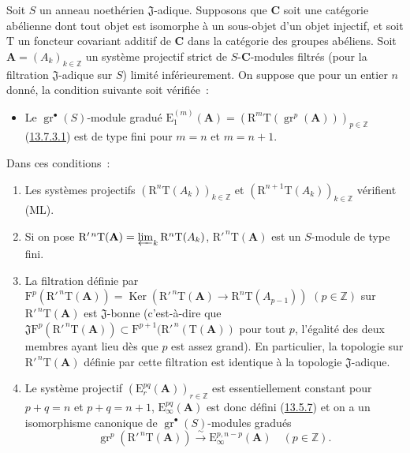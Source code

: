 \begin{proposition}[13.7.7]
\label{0.13.7.7-fr}
Soit $S$ un anneau noethérien $\mathfrak J$-adique. Supposons que $\boldsymbol{C}$ soit
une catégorie abélienne dont tout objet est isomorphe à un sous-objet d'un
objet injectif, et soit $\mathrm T$ un foncteur covariant additif de $\boldsymbol{C}$ dans
la catégorie des groupes abéliens. Soit
$\mathbf A=(A_k)_{k\in\mathbb Z}$ un
système projectif strict de $S$-$\boldsymbol{C}$-modules filtrés (pour la filtration
$\mathfrak J$-adique sur $S$) limité inférieurement. On suppose que pour un
entier $n$ donné, la condition suivante soit vérifiée~:
\begin{itemize}
\item[$(\mathrm F_n)$] Le $\operatorname{gr}^\bullet(S)$-module gradué
$\mathrm E_1^{(m)}(\mathbf A)=
(\mathrm R^m\mathrm T(\operatorname{gr}^p(\mathbf A)))_{p\in\mathbb Z}$
\textup{(\hyperref[0.13.7.3.1-fr]{13.7.3.1})} est de type fini pour $m=n$ et
$m=n+1$.
\end{itemize}
Dans ces conditions~:
\begin{enumerate}
\item[\rm(i)] Les systèmes projectifs
$(\mathrm R^n\mathrm T(A_k))_{k\in\mathbb Z}$ et
$(\mathrm R^{n+1}\mathrm T(A_k))_{k\in\mathbb Z}$ vérifient \textup{(ML)}.
\item[\rm(ii)] Si on pose
$\mathrm R'^{\,n}\mathrm T(\mathbf A)=
\varprojlim_k\mathrm R^n\mathrm T(A_k)$,
$\mathrm R'^{\,n}\mathrm T(\mathbf A)$ est un $S$-module de type fini.
\item[\rm(iii)] La filtration définie par
$\mathrm F^p(\mathrm R'^{\,n}\mathrm T(\mathbf A))=
\operatorname{Ker}(\mathrm R'^{\,n}\mathrm T(\mathbf A)
\to\mathrm R^n\mathrm T(A_{p-1}))$ $(p\in\mathbb Z)$
sur $\mathrm R'^{\,n}\mathrm T(\mathbf A)$ est $\mathfrak J$-bonne
(c'est-à-dire que
$\mathfrak J\mathrm F^p(\mathrm R'^{\,n}\mathrm T(\mathbf A))
\subset\mathrm F^{p+1}(\mathrm R'^{\,n}(\mathrm T(\mathbf A))$ pour tout
$p$, l'égalité des deux membres ayant lieu dès que $p$ est assez grand). En
particulier, la topologie sur $\mathrm R'^{\,n}\mathrm T(\mathbf A)$ définie
par cette filtration est identique à la topologie $\mathfrak J$-adique.
\item[\rm(iv)] Le système projectif
$(\mathrm E_r^{pq}(\mathbf A))_{r\in\mathbb Z}$ est essentiellement constant
pour $p+q=n$ et $p+q=n+1$, $\mathrm E_\infty^{pq}(\mathbf A)$ est donc défini
\textup{(\hyperref[0.13.5.7-fr]{13.5.7})} et on a un isomorphisme canonique de
$\operatorname{gr}^\bullet(S)$-modules gradués
\begin{equation}
\label{0.13.7.7.1-fr}
\tag{13.7.7.1}
\operatorname{gr}^p(\mathrm R'^{\,n}\mathrm T(\mathbf A))
\xrightarrow{\sim}\mathrm E_\infty^{p,n-p}(\mathbf A)
\quad(p\in\mathbb Z).
\end{equation}
\end{enumerate}
\end{proposition}

